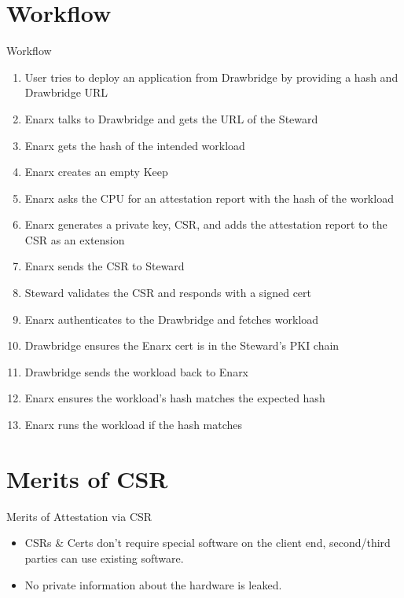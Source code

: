 \documentclass[graphics]{beamer}
\begin{document}
\section{Workflow}
\begin{frame}{Workflow}
    \begin{enumerate}
        \item User tries to deploy an application from Drawbridge by providing a hash and Drawbridge URL
        \item Enarx talks to Drawbridge and gets the URL of the Steward
        \item Enarx gets the hash of the intended workload
        \item Enarx creates an empty Keep
        \item Enarx asks the CPU for an attestation report with the hash of the workload
        \item Enarx generates a private key, CSR, and adds the attestation report to the CSR as an extension
        \item Enarx sends the CSR to Steward
        \item Steward validates the CSR and responds with a signed cert
        \item Enarx authenticates to the Drawbridge and fetches workload
        \item Drawbridge ensures the Enarx cert is in the Steward's PKI chain
        \item Drawbridge sends the workload back to Enarx
        \item Enarx ensures the workload's hash matches the expected hash
        \item Enarx runs the workload if the hash matches
    \end{enumerate}
\end{frame}

\section{Merits of CSR}
\begin{frame}{Merits of Attestation via CSR}
\begin{itemize}
    \item CSRs \& Certs don't require special software on the client end, second/third parties can use existing software.
    \item No private information about the hardware is leaked.
\end{itemize}
\end{frame}
\end{document}
